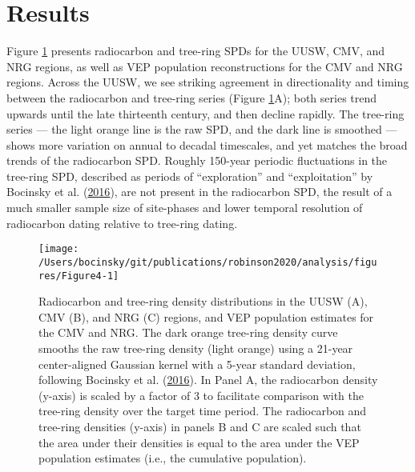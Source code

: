 \documentclass[
]{sa}
\begin{document}
\hypertarget{results}{%
\section*{Results}\label{results}}

Figure \ref{fig:Figure4} presents radiocarbon and tree-ring SPDs for the UUSW, CMV, and NRG regions, as well as VEP population reconstructions for the CMV and NRG regions. Across the UUSW, we see striking agreement in directionality and timing between the radiocarbon and tree-ring series (Figure \ref{fig:Figure4}A); both series trend upwards until the late thirteenth century, and then decline rapidly. The tree-ring series --- the light orange line is the raw SPD, and the dark line is smoothed --- shows more variation on annual to decadal timescales, and yet matches the broad trends of the radiocarbon SPD. Roughly 150-year periodic fluctuations in the tree-ring SPD, described as periods of ``exploration'' and ``exploitation'' by Bocinsky et al. (\protect\hyperlink{ref-Bocinsky2016}{2016}), are not present in the radiocarbon SPD, the result of a much smaller sample size of site-phases and lower temporal resolution of radiocarbon dating relative to tree-ring dating.



\begin{figure}

{\centering \texttt{[image: /Users/bocinsky/git/publications/robinson2020/analysis/figures/Figure4-1]} 

}

\caption{Radiocarbon and tree-ring density distributions in the UUSW (A), CMV (B), and NRG (C) regions, and VEP population estimates for the CMV and NRG. The dark orange tree-ring density curve smooths the raw tree-ring density (light orange) using a 21-year center-aligned Gaussian kernel with a 5-year standard deviation, following Bocinsky et al. (\protect\hyperlink{ref-Bocinsky2016}{2016}). In Panel A, the radiocarbon density (y-axis) is scaled by a factor of 3 to facilitate comparison with the tree-ring density over the target time period. The radiocarbon and tree-ring densities (y-axis) in panels B and C are scaled such that the area under their densities is equal to the area under the VEP population estimates (i.e., the cumulative population).}\label{fig:Figure4}
\end{figure}
\end{document}
